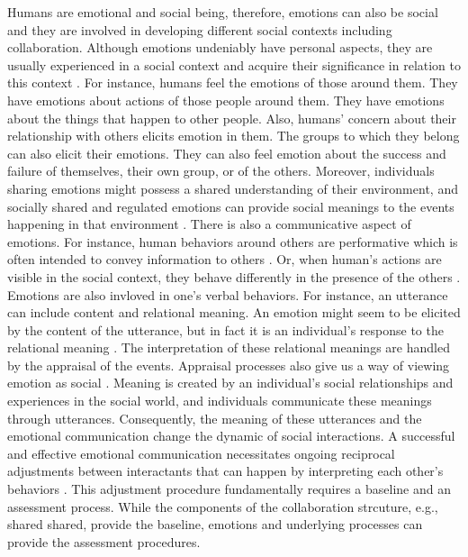 Humans are emotional and social being, therefore, emotions can also be social
and they are involved in developing different social contexts including
collaboration. Although emotions undeniably have personal aspects, they are
usually experienced in a social context and acquire their significance in
relation to this context \cite{parkinson:emotion-social-interaction}. For
instance, humans feel the emotions of those around them. They have emotions
about actions of those people around them. They have emotions about the things
that happen to other people. Also, humans' concern about their relationship with
others elicits emotion in them. The groups to which they belong can also elicit
their emotions. They can also feel emotion about the success and failure of
themselves, their own group, or of the others. Moreover, individuals sharing
emotions might possess a shared understanding of their environment, and socially
shared and regulated emotions can provide social meanings to the events
happening in that environment \cite{wisecup:sociology-emotions}. There is also a
communicative aspect of emotions. For instance, human behaviors around others
are performative which is often intended to convey information to others
\cite{goffman:self-presentation}. Or, when human's actions are visible in the
social context, they behave differently in the presence of the others
\cite{zajonc:social-facilitation}. Emotions are also invloved in one's verbal
behaviors. For instance, an utterance can include content and relational
meaning. An emotion might seem to be elicited by the content of the utterance,
but in fact it is an individual's response to the relational meaning
\cite{planalp:communicating-emotion}. The interpretation of these relational
meanings are handled by the appraisal of the events. Appraisal processes also
give us a way of viewing emotion as social \cite{hooft:sharing-emotions}.
Meaning is created by an individual's social relationships and experiences in
the social world, and individuals communicate these meanings through utterances.
Consequently, the meaning of these utterances and the emotional communication
change the dynamic of social interactions. A successful and effective emotional
communication necessitates ongoing reciprocal adjustments between interactants
that can happen by interpreting each other's behaviors
\cite{parkinson:emotion-social-interaction}. This adjustment procedure
fundamentally requires a baseline and an assessment process. While the
components of the collaboration strcuture, e.g., shared shared, provide the
baseline, emotions and underlying processes can provide the assessment
procedures.


